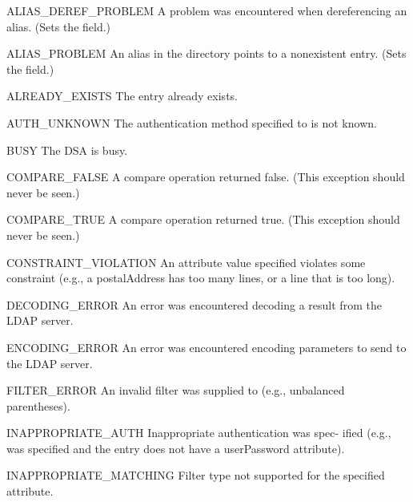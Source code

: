 \begin{excdesc}{ALIAS_DEREF_PROBLEM}
	A  problem was encountered when dereferencing an alias.
	(Sets the  field.)
\end{excdesc}
\begin{excdesc}{ALIAS_PROBLEM}
	An alias in the directory points to a nonexistent entry.
	(Sets the  field.)
\end{excdesc}
\begin{excdesc}{ALREADY_EXISTS}
	The entry already exists.
\end{excdesc}
\begin{excdesc}{AUTH_UNKNOWN}
	The authentication method specified to  is not known.
\end{excdesc}
\begin{excdesc}{BUSY}
	The DSA is busy.
\end{excdesc}
\begin{excdesc}{COMPARE_FALSE}
	A compare operation returned false.
	(This exception should never be seen.)
\end{excdesc}
\begin{excdesc}{COMPARE_TRUE}
	A compare operation returned true.
	(This exception should never be seen.)
\end{excdesc}
\begin{excdesc}{CONSTRAINT_VIOLATION}
	An attribute value specified  violates
	some constraint (e.g., a postalAddress
	has too many lines, or a line that  is
	too long).
\end{excdesc}
\begin{excdesc}{DECODING_ERROR}
	An  error  was  encountered decoding a
	result from the LDAP server.
\end{excdesc}
\begin{excdesc}{ENCODING_ERROR}
	An   error  was  encountered  encoding
	parameters to send to the LDAP server.
\end{excdesc}
\begin{excdesc}{FILTER_ERROR}
	An  invalid  filter  was  supplied  to
	 (e.g., unbalanced parentheses).
\end{excdesc}
\begin{excdesc}{INAPPROPRIATE_AUTH}
	Inappropriate authentication was spec-
	ified   (e.g.,    was
	specified and the entry does not  have
	a userPassword attribute).
\end{excdesc}
\begin{excdesc}{INAPPROPRIATE_MATCHING}
	   Filter  type  not  supported  for  the specified attribute.
\end{excdesc}
